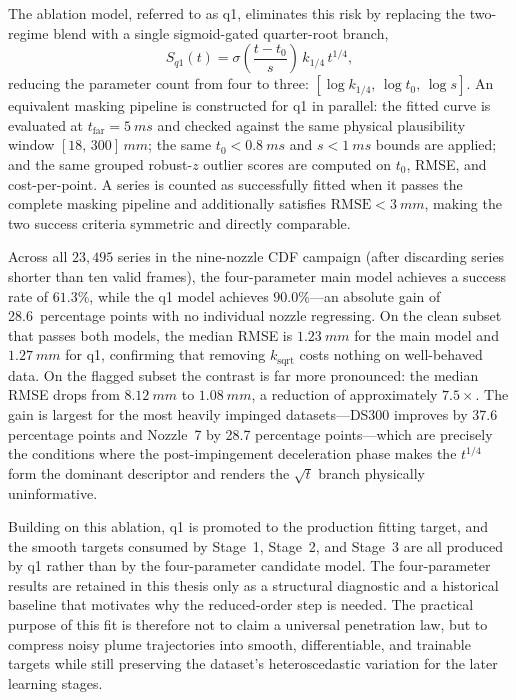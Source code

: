 \documentclass[english, 12pt, a4paper, elec, utf8, a-2b, online]{aaltothesis}
\begin{document}
The ablation model, referred to as q1, eliminates this risk by replacing the two-regime blend with a single sigmoid-gated quarter-root branch,
\[
S_{q1}(t) = \sigma\!\left(\frac{t-t_0}{s}\right)\,k_{1/4}\,t^{1/4},
\]
reducing the parameter count from four to three: \([\log k_{1/4},\,\log t_0,\,\log s]\). An equivalent masking pipeline is constructed for q1 in parallel: the fitted curve is evaluated at \(t_{\mathrm{far}}=\SI{5}{ms}\) and checked against the same physical plausibility window \([18,\,300]\,\si{mm}\); the same \(t_0 < \SI{0.8}{ms}\) and \(s < \SI{1}{ms}\) bounds are applied; and the same grouped robust-\(z\) outlier scores are computed on \(t_0\), RMSE, and cost-per-point. A series is counted as successfully fitted when it passes the complete masking pipeline and additionally satisfies \(\mathrm{RMSE} < \SI{3}{mm}\), making the two success criteria symmetric and directly comparable.

Across all \(23{,}495\) series in the nine-nozzle CDF campaign (after discarding series shorter than ten valid frames), the four-parameter main model achieves a success rate of \(61.3\%\), while the q1 model achieves \(90.0\%\)---an absolute gain of 28.6~percentage points with no individual nozzle regressing. On the clean subset that passes both models, the median RMSE is \(\SI{1.23}{mm}\) for the main model and \(\SI{1.27}{mm}\) for q1, confirming that removing \(k_{\mathrm{sqrt}}\) costs nothing on well-behaved data. On the flagged subset the contrast is far more pronounced: the median RMSE drops from \(\SI{8.12}{mm}\) to \(\SI{1.08}{mm}\), a reduction of approximately \(7.5\times\). The gain is largest for the most heavily impinged datasets---DS300 improves by 37.6 percentage points and Nozzle~7 by 28.7 percentage points---which are precisely the conditions where the post-impingement deceleration phase makes the \(t^{1/4}\) form the dominant descriptor and renders the \(\sqrt{t}\) branch physically uninformative.

Building on this ablation, q1 is promoted to the production fitting target, and the smooth targets consumed by Stage~1, Stage~2, and Stage~3 are all produced by q1 rather than by the four-parameter candidate model. The four-parameter results are retained in this thesis only as a structural diagnostic and a historical baseline that motivates why the reduced-order step is needed. The practical purpose of this fit is therefore not to claim a universal penetration law, but to compress noisy plume trajectories into smooth, differentiable, and trainable targets while still preserving the dataset's heteroscedastic variation for the later learning stages.
\end{document}
